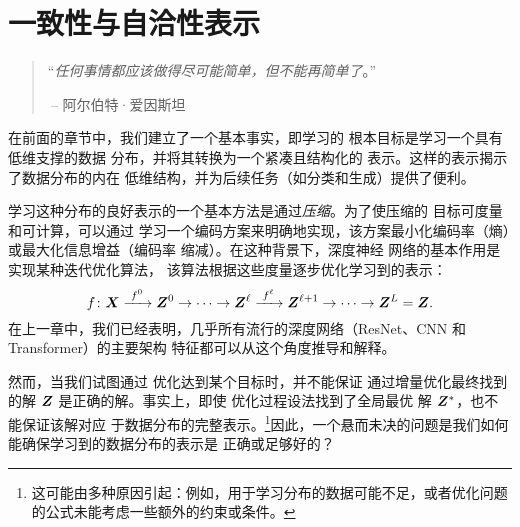 \documentclass[../../book-main_zh.tex]{subfiles}
\begin{document}
\chapter{一致性与自洽性表示}
\label{ch:consistent}\label{ch:autoencoding}
\label{ch:self-consistent}\label{ch:closed-loop}

\begin{quote}
\hfill  “{\em 任何事情都应该做得尽可能简单，但不能再简单了}。”

$~$\hfill -- 阿尔伯特·爱因斯坦
\end{quote}



\vspace{5mm}


在前面的章节中，我们建立了一个基本事实，即学习的
根本目标是学习一个具有低维支撑的数据
分布，并将其转换为一个紧凑且结构化的
表示。这样的表示揭示了数据分布的内在
低维结构，并为后续任务（如分类和生成）提供了便利。

学习这种分布的良好表示的一个基本方法是通过{\em 压缩}。为了使压缩的
目标可度量和可计算，可以通过
学习一个编码方案来明确地实现，该方案最小化编码率（熵）或最大化信息增益（编码率
缩减）。在这种背景下，深度神经
网络的基本作用是实现某种迭代优化算法，
该算法根据这些度量逐步优化学习到的表示：
\begin{equation}
  f\colon \bm{X}
  \xrightarrow{\hspace{1mm} f^0 \hspace{1mm}} \bm{Z}^0 \rightarrow \cdots
  \rightarrow \bm{Z}^\ell \xrightarrow{\hspace{1mm} f^\ell \hspace{1mm}}
  \bm{Z}^{\ell+1} \rightarrow  \cdots \to \bm{Z}^L = \bm{Z}.
\end{equation}
在上一章中，我们已经表明，几乎所有流行的深度网络（ResNet、CNN 和
Transformer）的主要架构
特征都可以从这个角度推导和解释。

然而，当我们试图通过
优化达到某个目标时，并不能保证
通过增量优化最终找到的解 $\bm{Z}$ 是正确的解。事实上，即使
优化过程设法找到了全局最优
解 $\bm{Z}^*$，也不能保证该解对应
于数据分布的完整表示。\footnote{这可能由多种原因引起：例如，用于学习分布的数据可能不足，或者优化问题的公式未能考虑一些额外的约束或条件。}因此，一个悬而未决的问题是我们如何能确保学习到的数据分布的表示是
正确或足够好的？
\end{document}
